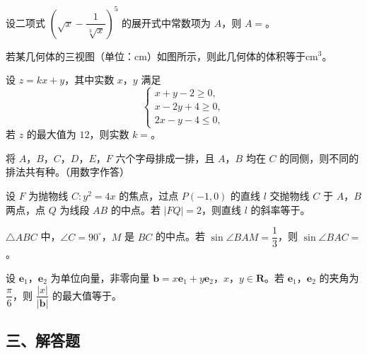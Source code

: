 \begin{question}
设二项式 $\left(\sqrt x-\dfrac1{\sqrt[3]x}\right)^5$ 的展开式中常数项为 $A$，则 $A=$\gkblank{}。

\Needspace{0.4\textheight}
\end{question}
\begin{question}
若某几何体的三视图（单位：cm）如图所示，则此几何体的体积等于\gkblank{}$\mathrm{cm}^3$。
\nopagebreak[4]
\begin{center}\end{center}
\nopagebreak[4]
\end{question}
\begin{question}
设 $z=kx+y$，其中实数 $x$，$y$ 满足
\nopagebreak[4]
\[\begin{cases}
x+y-2\geqslant0,\\
x-2y+4\geqslant0,\\
2x-y-4\leqslant0,
\end{cases}\]
若 $z$ 的最大值为 $12$，则实数 $k=$\gkblank{}。

\end{question}
\begin{question}
将 $A$，$B$，$C$，$D$，$E$，$F$ 六个字母排成一排，且 $A$，$B$ 均在 $C$ 的同侧，则不同的排法共有\gkblank{}种。（用数字作答）

\end{question}
\begin{question}
设 $F$ 为抛物线 $C:y^2=4x$ 的焦点，过点 $P(-1,0)$ 的直线 $l$ 交抛物线 $C$ 于 $A$，$B$ 两点，点 $Q$ 为线段 $AB$ 的中点。若 $|FQ|=2$，则直线 $l$ 的斜率等于\gkblank{}。

\end{question}
\begin{question}
$\triangle ABC$ 中，$\angle C=90^\circ$，$M$ 是 $BC$ 的中点。若 $\sin\angle BAM=\dfrac13$，则 $\sin\angle BAC=$\gkblank{}。

\end{question}
\begin{question}
设 $\boldsymbol e_1$，$\boldsymbol e_2$ 为单位向量，非零向量 $\boldsymbol b=x\boldsymbol e_1+y\boldsymbol e_2$，$x$，$y\in\mathbf R$。若 $\boldsymbol e_1$，$\boldsymbol e_2$ 的夹角为 $\dfrac\pi6$，则 $\dfrac{|x|}{|\boldsymbol b|}$ 的最大值等于\gkblank{}。

\end{question}
\begingroup
\renewcommand{\gkpart}[1]{\Needspace{0.3\textheight}\subsection*{#1}\nopagebreak}
\gkpart{三、解答题}
\endgroup

